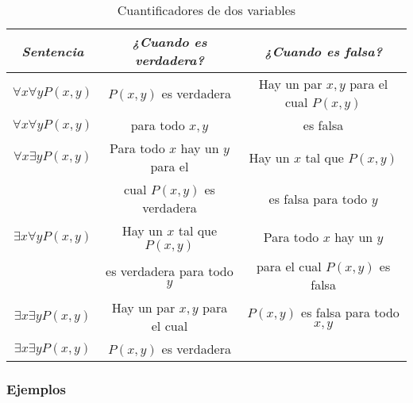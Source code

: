 \documentclass[]{article}
\begin{document}
\begin{table}[H]
	\caption*{Cuantificadores de dos variables}
	\begin{center}
		\begin{tabular}{|c|c|c|}
			\hline
			\textit{Sentencia} & \textit{¿Cuando es verdadera?} & \textit{¿Cuando es falsa?}\\
			\hline
			$\forall{x}\forall{y}P(x, y)$ & $P(x, y)$ es verdadera & Hay un par $x, y$ para el cual $P(x, y)$\\
			$\forall{x}\forall{y}P(x, y)$ & para todo $x, y$ & es falsa\\
			\hline
			$\forall{x}\exists{y}P(x, y)$ & Para todo $x$ hay un $y$ para el & Hay un $x$ tal que $P(x, y)$ \\
			 & cual $P(x, y)$ es verdadera & es falsa para todo $y$ \\
			\hline
			$\exists{x}\forall{y}P(x, y)$ & Hay un $x$ tal que $P(x, y)$ & Para todo $x$ hay un $y$ \\
			 & es verdadera para todo $y$ & para el cual  $P(x, y)$ es falsa \\
			\hline
			$\exists{x}\exists{y}P(x, y)$ & Hay un par $x, y$ para el cual & $P(x, y)$ es falsa para todo $x, y$\\
			$\exists{x}\exists{y}P(x, y)$ & $P(x, y)$ es verdadera &  \\
			\hline
		\end{tabular}
	\end{center}
\end{table}

\subsubsection*{Ejemplos}
\end{document}
